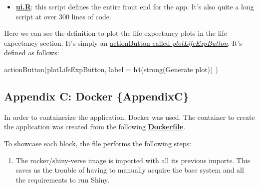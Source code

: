 \documentclass[
  a4paper]{article}
\newenvironment{Shaded}{\begin{snugshade}}{\end{snugshade}}
\newcommand{\AttributeTok}[1]{\textcolor[rgb]{0.77,0.63,0.00}{#1}}
\newcommand{\FunctionTok}[1]{\textcolor[rgb]{0.00,0.00,0.00}{#1}}
\newcommand{\NormalTok}[1]{#1}
\newcommand{\StringTok}[1]{\textcolor[rgb]{0.31,0.60,0.02}{#1}}
\providecommand{\tightlist}{%
  \setlength{\itemsep}{0pt}\setlength{\parskip}{0pt}}
\begin{document}
\begin{itemize}
\tightlist
\item
  \href{https://github.com/dreth/tfm_uc3m/blob/main/dashboard/ui.R}{\textbf{ui.R}}:
  this script defines the entire front end for the app. It's also quite
  a long script at over 300 lines of code.
\end{itemize}

Here we can see the definition to plot the life expectancy plots in the
life expectancy section. It's simply an
\href{https://github.com/dreth/tfm_uc3m/blob/report_ref/dashboard/ui.R\#L140-L142}{actionButton
called \emph{plotLifeExpButton}}. It's defined as follows:

\footnotesize

\begin{Shaded}
\begin{Highlighting}[]
\FunctionTok{actionButton}\NormalTok{(}\StringTok{\textquotesingle{}plotLifeExpButton\textquotesingle{}}\NormalTok{,}
\AttributeTok{label =} \FunctionTok{h4}\NormalTok{(}\FunctionTok{strong}\NormalTok{(}\StringTok{\textquotesingle{}Generate plot\textquotesingle{}}\NormalTok{))}
\NormalTok{)}
\end{Highlighting}
\end{Shaded}

\normalsize

\newpage

\hypertarget{appendix-c-docker-appendixc}{%
\subsection{Appendix C: Docker
\{AppendixC\}}\label{appendix-c-docker-appendixc}}

In order to containerize the application, Docker was used. The container
to create the application was created from the following
\href{https://github.com/dreth/tfm_uc3m/blob/main/docker/Dockerfile}{\textbf{Dockerfile}}.

To showcase each block, the file performs the following steps:

\begin{enumerate}
\def\labelenumi{\arabic{enumi}.}
\tightlist
\item
  The rocker/shiny-verse image is imported with all its previous
  imports. This saves us the trouble of having to manually acquire the
  base system and all the requirements to run Shiny.
\end{enumerate}

\footnotesize
\end{document}

